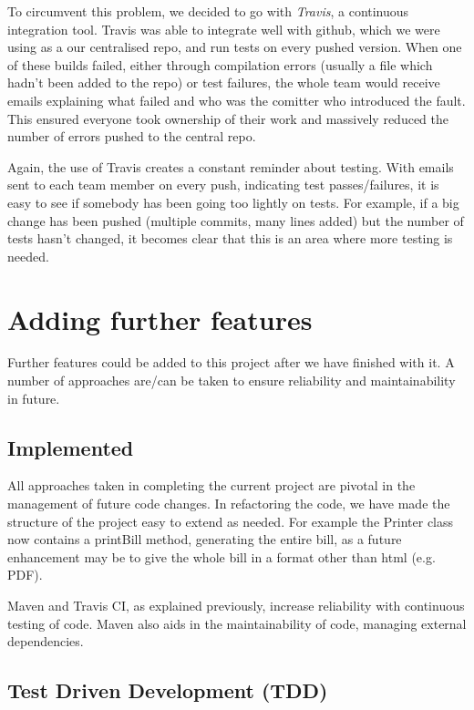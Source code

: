 \documentclass[a4paper]{article}
\begin{document}
To circumvent this problem, we decided to go with \emph{Travis}, a continuous
integration tool. Travis was able to integrate well with github, which we were
using as a our centralised repo, and run tests on every pushed version. When one
of these builds failed, either through compilation errors (usually a file which
hadn't been added to the repo) or test failures, the whole team would receive
emails explaining what failed and who was the comitter who introduced the fault.
This ensured everyone took ownership of their work and massively reduced the 
number of errors pushed to the central repo.

Again, the use of Travis creates a constant reminder about testing. With emails
sent to each team member on every push, indicating test passes/failures, it is
easy to see if somebody has been going too lightly on tests. For example, if
a big change has been pushed (multiple commits, many lines added) but the number
of tests hasn't changed, it becomes clear that this is an area where more testing
is needed.

\section{Adding further features}

Further features could be added to this project after we have finished with it.
A number of approaches are/can be taken to ensure reliability and maintainability
in future.

\subsection{Implemented}

All approaches taken in completing the current project are pivotal in the management
of future code changes. In refactoring the code, we have made the structure of
the project easy to extend as needed. For example the Printer class now contains
a printBill method, generating the entire bill, as a future enhancement may be to
give the whole bill in a format other than html (e.g. PDF).

Maven and Travis CI, as explained previously, increase reliability with continuous
testing of code. Maven also aids in the maintainability of code, managing external
dependencies.

\subsection{Test Driven Development (TDD)}
\end{document}
